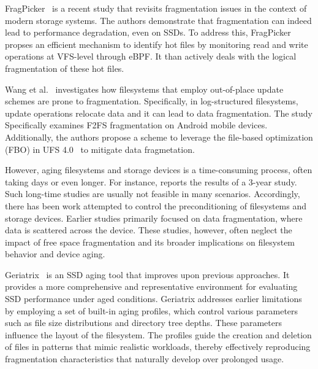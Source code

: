 FragPicker~\cite{fragpicker:sosp21} is a recent study that revisits fragmentation issues in the context of modern storage systems.
The authors demonstrate that fragmentation can indeed lead to performance degradation, even on SSDs.
To address this, FragPicker propses an efficient mechanism to identify hot files by monitoring read and write operations at VFS-level through eBPF.
It than actively deals with the logical fragmentation of these hot files.

Wang et al.~\cite{f2fs-mobile:nvmsa24} investigates how filesystems that employ out-of-place update schemes are prone to fragmentation.
Specifically, in log-structured filesystems, update operations relocate data and it can lead to data fragmentation.
The study Specifically examines F2FS fragmentation on Android mobile devices.
Additionally, the authors propose a scheme to leverage the file-based optimization (FBO) in UFS 4.0~\cite{ufs4.0} to mitigate data fragmetation.


However, aging filesystems and storage devices is a time-consuming process, often taking days or even longer.
For instance, \cite{fs-aging:sigmetrics97} reports the results of a 3-year study.
Such long-time studies are usually not feasible in many scenarios.
Accordingly, there has been work attempted to control the preconditioning of filesystems and storage devices.
Earlier studies primarily focused on data fragmentation, where data is scattered across the device.
These studies, however, often neglect the impact of free space fragmentation and its broader implications on filesystem behavior and device aging.

Geriatrix~\cite{geriatrix:atc18} is an SSD aging tool that improves upon previous approaches.
It provides a more comprehensive and representative environment for evaluating SSD performance under aged conditions.
Geriatrix addresses earlier limitations by employing a set of built-in aging profiles, which control various parameters such as file size distributions and directory tree depths.
These parameters influence the layout of the filesystem.
The profiles guide the creation and deletion of files in patterns that mimic realistic workloads, thereby effectively reproducing fragmentation characteristics that naturally develop over prolonged usage.
